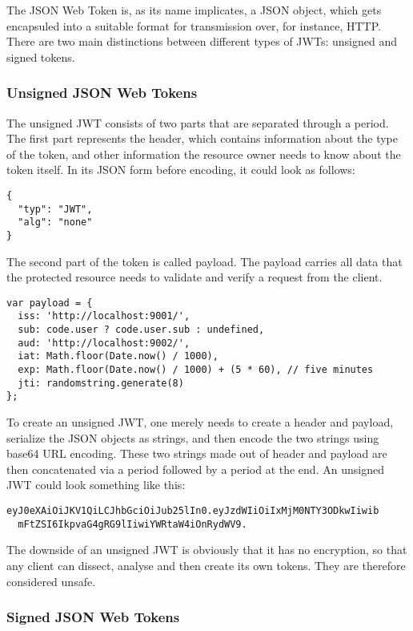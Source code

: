 The JSON Web Token is, as its name implicates, a JSON object, which gets encapsuled into a suitable format for transmission over, for instance, HTTP. There are two main distinctions between different types of JWTs: unsigned and signed tokens.

\subsubsection{Unsigned JSON Web Tokens}

The unsigned JWT consists of two parts that are separated through a period. The first part represents the header, which contains information about the type of the token, and other information the resource owner needs to know about the token itself. In its JSON form before encoding, it could look as follows:

\begin{verbatim}
{
  "typ": "JWT",
  "alg": "none"
}
\end{verbatim}

The second part of the token is called payload. The payload carries all data that the protected resource needs to validate and verify a request from the client. 

\begin{verbatim}
var payload = {
  iss: 'http://localhost:9001/',
  sub: code.user ? code.user.sub : undefined,
  aud: 'http://localhost:9002/',
  iat: Math.floor(Date.now() / 1000),
  exp: Math.floor(Date.now() / 1000) + (5 * 60), // five minutes
  jti: randomstring.generate(8)
};
\end{verbatim}

To create an unsigned JWT, one merely needs to create a header and payload, serialize the JSON objects as strings, and then encode the two strings using base64 URL encoding. These two strings made out of header and payload are then concatenated via a period followed by a period at the end. An unsigned JWT could look something like this:

\begin{verbatim}
eyJ0eXAiOiJKV1QiLCJhbGciOiJub25lIn0.eyJzdWIiOiIxMjM0NTY3ODkwIiwib
  mFtZSI6IkpvaG4gRG9lIiwiYWRtaW4iOnRydWV9.
\end{verbatim}

The downside of an unsigned JWT is obviously that it has no encryption, so that any client can dissect, analyse and then create its own tokens. They are therefore considered unsafe.

\subsubsection{Signed JSON Web Tokens}

